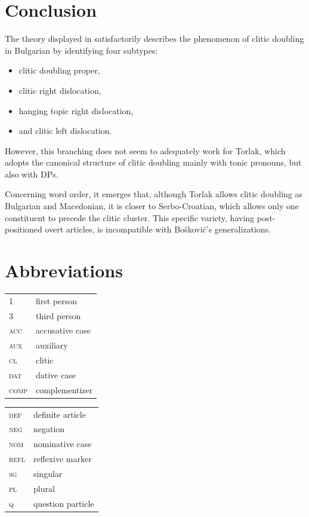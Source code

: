 \documentclass[output=paper,
colorlinks,
citecolor=brown,
newtxmath
]{langscibook}
\begin{document}
\section{Conclusion}
\label{sec:conclusion}

The theory displayed in \citet{Cinque.Krapova2008} satisfactorily describes the phenomenon of clitic doubling in Bulgarian by identifying four subtypes:
\begin{itemize}
\item clitic doubling proper,
\item clitic right dislocation,
\item hanging topic right dislocation,
\item and clitic left dislocation.
\end{itemize}
However, this branching does not seem to adequately work for Torlak, which adopts the canonical structure of clitic doubling mainly with tonic pronouns, but also with DPs.

Concerning word order, it emerges that, although Torlak allows clitic doubling as Bulgarian and Macedonian, it is closer to Serbo-Croatian, which allows only one constituent to precede the clitic cluster. This specific variety, having post-positioned overt articles, is incompatible with Bošković’s generalizations.


\section*{Abbreviations}

\begin{tabularx}{.45\textwidth}{lX}
\textsc{1}&first person\\
\textsc{3}&third person\\
\textsc{acc}&accusative case\\
\textsc{aux}&auxiliary\\
\textsc{cl}&clitic\\
\textsc{dat}&dative case\\
\textsc{comp}&complementizer\\
\end{tabularx}
\begin{tabularx}{.45\textwidth}{lX}
\textsc{def}&definite article\\
\textsc{neg}&negation\\
\textsc{nom}&nominative case\\
\textsc{refl}&reflexive marker\\
\textsc{sg}&singular\\
\textsc{pl}&plural\\
\textsc{q}&question particle\\
\end{tabularx}
\end{document}
